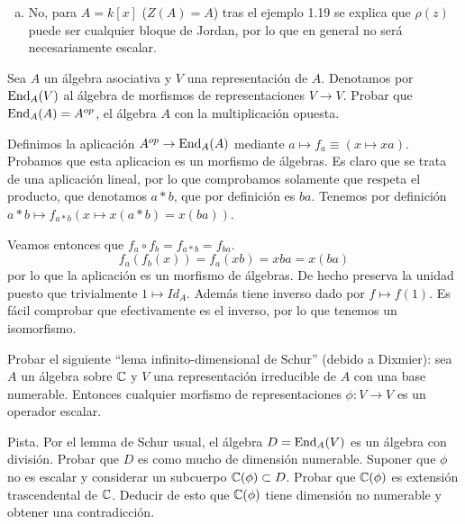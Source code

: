 \documentclass[twoside]{article}
\begin{document}
\begin{solucion}
\begin{enumerate}[(a)]
\item No, para $A=k[x]$ ($Z(A)=A$) tras el ejemplo 1.19 se explica que $\rho(z)$ puede ser cualquier bloque de Jordan, por lo que en general no será necesariamente escalar. 

\end{enumerate}
\end{solucion}

\newpage

\begin{ejercicio}{1.22}
Sea $A$ un álgebra asociativa y $V$ una representación de $A$. Denotamos por $\operatorname{End}_A(V)$ al álgebra de morfismos de representaciones $V\to V$. Probar que $\operatorname{End}_A(A)=A^{op}$, el álgebra $A$ con la multiplicación opuesta.
\end{ejercicio}
\begin{solucion}
Definimos la aplicación $A^{op}\to \operatorname{End}_A(A)$ mediante $a\mapsto f_a \equiv (x\mapsto xa)$. Probamos que esta aplicacion es un morfismo de álgebras. Es claro que se trata de una aplicación lineal, por lo que comprobamos solamente que respeta el producto, que denotamos $a*b$, que por definición es $ba$. Tenemos por definición $a*b\mapsto f_{a*b}(x\mapsto x(a*b)=x(ba))$.

Veamos entonces que $f_a\circ f_b=f_{a*b}=f_{ba}$. 
\[
f_a(f_b(x))=f_a(xb)=xba=x(ba)
\]
por lo que la aplicación es un morfismo de álgebras. De hecho preserva la unidad puesto que trivialmente $1\mapsto Id_A$. Además tiene inverso dado por $f\mapsto f(1)$. Es fácil comprobar que efectivamente es el inverso, por lo que tenemos un isomorfismo. 
\end{solucion}

\newpage
\begin{ejercicio}{1.23}
Probar el siguiente ``lema infinito-dimensional de Schur'' (debido a Dixmier): sea $A$ un álgebra sobre $\mathbb{C}$ y $V$ una representación irreducible de $A$ con una base numerable. Entonces cualquier morfismo de representaciones $\phi:V\to V$ es un operador escalar.

Pista. Por el lemma de Schur usual, el álgebra $D=\operatorname{End}_A(V)$ es un álgebra con división. Probar que $D$ es como mucho de dimensión numerable. Suponer que $\phi$ no es escalar y considerar un subcuerpo $\mathbb{C}(\phi)\subset D$. Probar que $\mathbb{C}(\phi)$ es extensión trascendental de $\mathbb{C}$. Deducir de esto que $\mathbb{C}(\phi)$  tiene dimensión no numerable y obtener una contradicción.
\end{ejercicio}
\begin{solucion}
\end{solucion}
\end{document}
